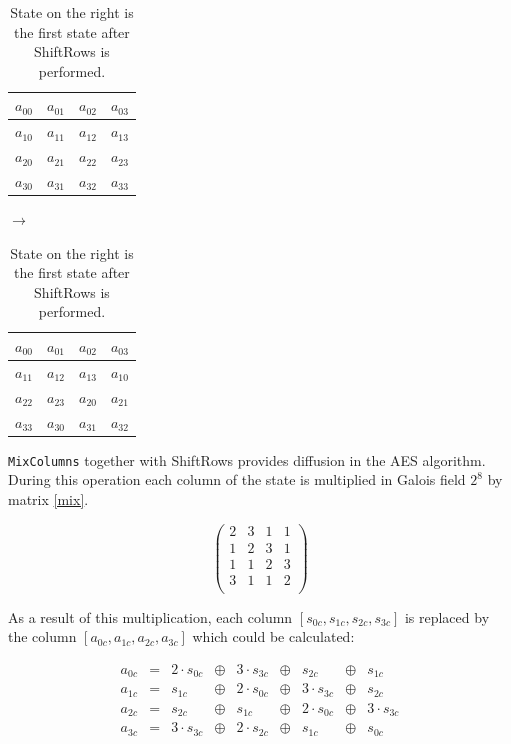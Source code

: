 \begin{table}[H]
\label{shift}
\begin{center}
\begin{tabular}{|c|c|c|c|}\hline%
 $a_{00}$ & $a_{01}$ & $a_{02}$ & $a_{03}$  \\\hline
 $a_{10}$ & $a_{11}$ & $a_{12}$ & $a_{13}$  \\\hline
 $a_{20}$ & $a_{21}$ & $a_{22}$ & $a_{23}$  \\\hline
 $a_{30}$ & $a_{31}$ & $a_{32}$ & $a_{33}$  \\\hline
\end{tabular}
$\longrightarrow$
\begin{tabular}{|c|c|c|c|}\hline%
 $a_{00}$ & $a_{01}$ & $a_{02}$ & $a_{03}$  \\\hline
 $a_{11}$ & $a_{12}$ & $a_{13}$ & $a_{10}$  \\\hline
 $a_{22}$ & $a_{23}$ & $a_{20}$ & $a_{21}$  \\\hline
 $a_{33}$ & $a_{30}$ & $a_{31}$ & $a_{32}$  \\\hline
\end{tabular}
\end{center}
\caption{State on the right is the first state after ShiftRows is performed.}
\end{table}

\hspace{-1.5em}\texttt{MixColumns} together with ShiftRows provides diffusion in
the AES algorithm. During this operation each column of the state is multiplied 
in Galois field $2^8$ by matrix \ref{mix}.

\begin{equation}
\label{mix}
\left(
\begin{array}{cccc}%
 2 & 3 & 1 & 1  \\
 1 & 2 & 3 & 1  \\
 1 & 1 & 2 & 3  \\
 3 & 1 & 1 & 2  \\
\end{array}
\right)
\end{equation}

As a result of this multiplication, each column $[s_{0c}, s_{1c}, s_{2c}, 
s_{3c}]$ is replaced by the column $[a_{0c}, a_{1c}, a_{2c}, a_{3c}]$ which 
could be calculated:

\begin{equation}
\begin{array}{lllllllll}
a_{0c} &=& 2\cdot s_{0c} &\oplus& 3\cdot s_{3c} &\oplus& s_{2c} &\oplus& s_{1c} \\
a_{1c} &=& s_{1c} &\oplus& 2\cdot s_{0c} &\oplus& 3\cdot s_{3c} &\oplus& s_{2c} \\
a_{2c} &=& s_{2c} &\oplus& s_{1c} &\oplus& 2\cdot s_{0c} &\oplus& 3\cdot s_{3c} \\
a_{3c} &=& 3\cdot s_{3c} &\oplus& 2\cdot s_{2c} &\oplus& s_{1c} &\oplus& s_{0c}
\end{array}
\end{equation}


